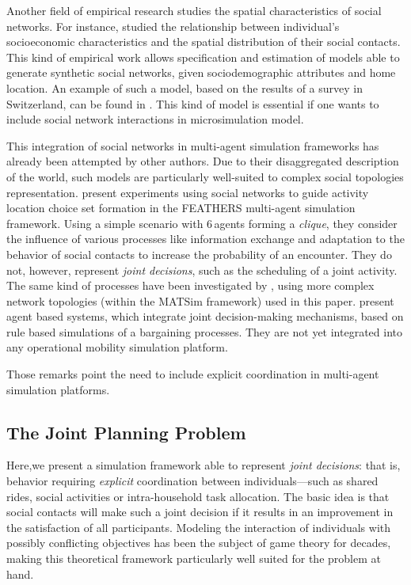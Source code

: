 {Another field of empirical research studies the spatial characteristics of social networks. For instance, \citet{CarrascoJAEtAl_TRR_2008} studied the relationship between individual's socioeconomic
characteristics and the spatial distribution of their social contacts. This kind of empirical work allows specification and estimation of models able to generate synthetic social networks, given sociodemographic attributes and home location. An example of such a model, based on the results of a survey in Switzerland, can be found in \citet{ArentzeEtAl_TRB_2012}. This kind of model is essential if one wants to include social network interactions in microsimulation model.

This integration of social networks in multi-agent simulation frameworks has already been attempted by other authors. Due to their disaggregated description of the world, such models are particularly well-suited to complex social topologies representation. \citet{HanQEtAl_TransResPartA_2011} present experiments using social networks to guide activity location choice set formation in the FEATHERS multi-agent simulation framework. Using a simple scenario with 6\,agents forming a \emph{clique}, %
they consider the influence of various processes like information exchange and adaptation to the behavior of social contacts to increase the probability of an encounter. They do not, however, represent \emph{joint decisions}, such as the scheduling of a joint activity. The same kind of processes have been investigated by \citet{Hackney_PhDThesis_2009}, using more complex network topologies (within the MATSim framework) used in this paper. \citet{RonaldEtAl_TransResB_2012, MaEtAl_TRR_2011,MaEtAl_IATBR_2012} present agent based systems, which integrate joint decision-making mechanisms, based on rule based simulations of a bargaining processes. They are not yet integrated into any operational mobility simulation platform.

Those remarks point the need to include explicit coordination in multi-agent simulation platforms.

\subsection{The Joint Planning Problem}
Here,we present a simulation framework able to represent \emph{joint decisions}: that is, behavior requiring \emph{explicit} coordination between individuals---such as shared rides, social activities or intra-household task allocation. The basic idea is that social contacts will make such a joint decision if it results in an improvement in the satisfaction of all participants.  Modeling  the interaction of individuals with possibly conflicting objectives has been the subject of game theory for decades, making this theoretical framework particularly well suited for the problem at hand.

}
